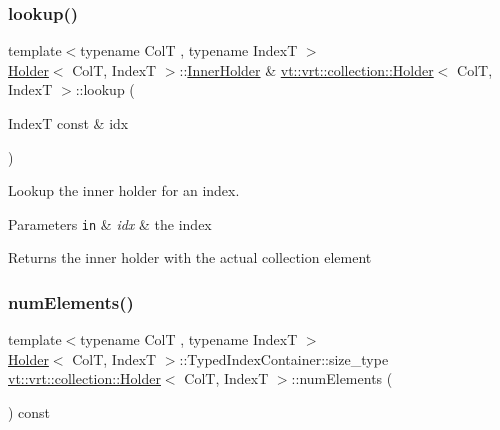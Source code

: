 \subsubsection{\texorpdfstring{lookup()}{lookup()}}
{\footnotesize\ttfamily template$<$typename ColT , typename IndexT $>$ \\
\hyperlink{structvt_1_1vrt_1_1collection_1_1_holder}{Holder}$<$ ColT, IndexT $>$\+::\hyperlink{structvt_1_1vrt_1_1collection_1_1_holder_aafc9b515450179bad7f03e17010b59f8}{Inner\+Holder} \& \hyperlink{structvt_1_1vrt_1_1collection_1_1_holder}{vt\+::vrt\+::collection\+::\+Holder}$<$ ColT, IndexT $>$\+::lookup (\begin{DoxyParamCaption}\item[{IndexT const \&}]{idx }\end{DoxyParamCaption})}



Lookup the inner holder for an index. 


\begin{DoxyParams}[1]{Parameters}
\mbox{\tt in}  & {\em idx} & the index\\
\hline
\end{DoxyParams}
\begin{DoxyReturn}{Returns}
the inner holder with the actual collection element 
\end{DoxyReturn}
\mbox{\label{structvt_1_1vrt_1_1collection_1_1_holder_aebff9d8a0b857688bf3b303cb832b543}} 
\subsubsection{\texorpdfstring{num\+Elements()}{numElements()}}
{\footnotesize\ttfamily template$<$typename ColT , typename IndexT $>$ \\
\hyperlink{structvt_1_1vrt_1_1collection_1_1_holder}{Holder}$<$ ColT, IndexT $>$\+::Typed\+Index\+Container\+::size\+\_\+type \hyperlink{structvt_1_1vrt_1_1collection_1_1_holder}{vt\+::vrt\+::collection\+::\+Holder}$<$ ColT, IndexT $>$\+::num\+Elements (\begin{DoxyParamCaption}{ }\end{DoxyParamCaption}) const}



